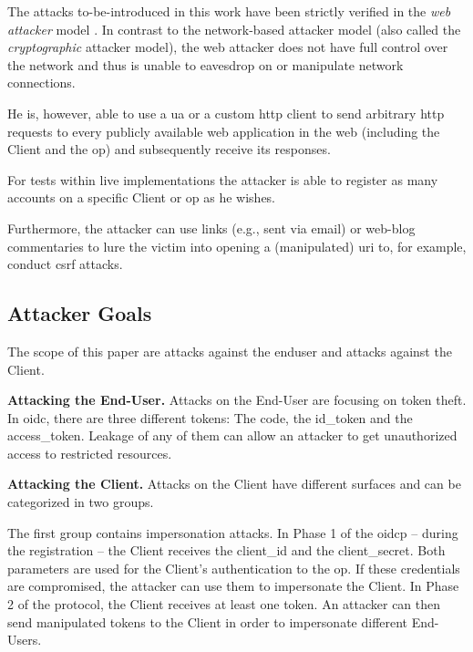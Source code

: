 \documentclass[conference,compsoc]{IEEEtran}
\renewcommand*{\paragraph}[1]{\vspace{2mm}\noindent\textbf{#1.}}
\begin{document}
The attacks to-be-introduced in this work have been strictly verified in the \emph{web attacker} model \cite{Barth2009}.
In contrast to the network-based attacker model (also called the \emph{cryptographic} attacker model), the web attacker does not have full control over the network and thus is unable to eavesdrop on or manipulate network connections.

He is, however, able to use a \gls{ua} or a custom \gls{http} client to send arbitrary \gls{http} requests to every publicly available web application in the web (including the Client and the \gls{op}) and subsequently receive its responses.


For tests within live implementations the attacker is able to register as many accounts on a specific Client or \gls{op} as he wishes.

Furthermore, the attacker can use links (e.g., sent via email) or web-blog commentaries to lure the victim into opening a (manipulated) \gls{uri} to, for example, conduct \gls{csrf} attacks.












\subsection{Attacker Goals}
\label{sec:attackerGolas}

The scope of this paper are attacks against the \gls{enduser} and attacks against the Client.


\paragraph{Attacking the End-User}
Attacks on the End-User are focusing on token theft.
In \gls{oidc}, there are three different tokens:
The \gls{code}, the \gls{id_token} and the \gls{access_token}.
Leakage of any of them can allow an attacker to get unauthorized access to restricted resources.

\paragraph{Attacking the Client}
Attacks on the Client have different surfaces and can be categorized in two groups.

The first group contains impersonation attacks.
In Phase 1 of the \gls{oidcp} -- during the registration -- the Client receives the \gls{client_id} and the \gls{client_secret}.
Both parameters are used for the Client's authentication to the \gls{op}.
If these credentials are compromised, the attacker can use them to impersonate the Client.
In Phase 2 of the protocol, the Client receives at least one token.
An attacker can then send manipulated tokens to the Client in order to impersonate different End-Users.
\end{document}
